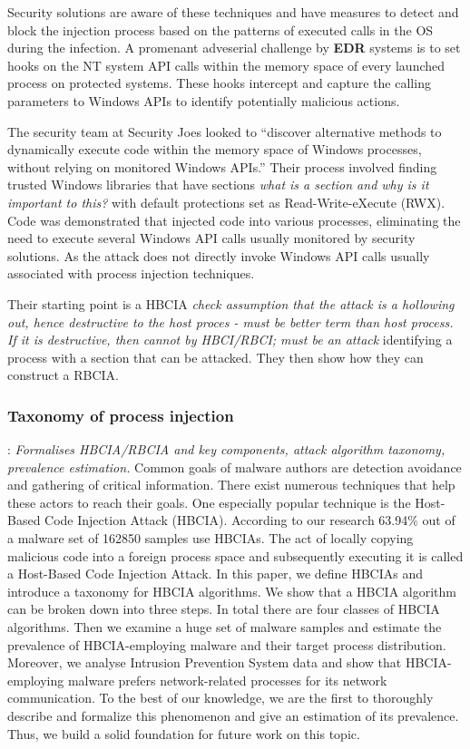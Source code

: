 \documentclass{article}
\begin{document}
Security solutions are aware of these techniques and have measures to detect and block the injection process based
on the patterns of executed calls in the OS during the infection.  A promenant adveserial challenge by \textbf{EDR}
systems is to set hooks on the NT system API calls within the memory space of every launched process on protected
systems.  These hooks intercept and capture the calling parameters to Windows APIs to identify potentially malicious actions.

The security team at Security Joes looked to ``discover alternative methods to dynamically execute code within
the memory space of Windows processes, without relying on monitored Windows APIs.''  Their process involved
finding trusted Windows libraries that have sections \textit{what is a section and why is it important to this?}
with default protections set as Read-Write-eXecute (RWX).  Code was demonstrated that injected code into various
processes, eliminating the need to execute several Windows API calls usually monitored by security solutions.
As the attack does not directly invoke Windows API calls usually associated with process injection techniques.

Their starting point is a HBCIA \textit{check assumption that the attack is a hollowing out, hence destructive to the host proces - must be better term than host process. If it is destructive, then cannot by HBCI/RBCI; must be an attack} identifying a process with a section that can be attacked.  They then show how they can construct a RBCIA.

\subsubsection{\textcite{Barabosch:2014} Taxonomy of process injection}
\textbf{}: \textit{Formalises HBCIA/RBCIA and key components, attack algorithm taxonomy, prevalence estimation.}  Common goals of malware authors are detection avoidance and gathering of critical information. There exist numerous techniques that help these actors to reach their goals. One especially popular technique is the Host-Based Code Injection Attack (HBCIA). According to our research 63.94\% out of a malware set of 162850 samples use HBCIAs. The act of locally copying malicious code into a foreign process space and subsequently executing it is called a Host-Based Code Injection Attack. In this paper, we define HBCIAs and introduce a taxonomy for HBCIA algorithms. We show that a HBCIA algorithm can be broken down into three steps. In total there are four classes of HBCIA algorithms. Then we examine a huge set of malware samples and estimate the prevalence of HBCIA-employing malware and their target process distribution. Moreover, we analyse Intrusion Prevention System data and show that HBCIA-employing malware prefers network-related processes for its network communication. To the best of our knowledge, we are the first to thoroughly describe and formalize this phenomenon and give an estimation of its prevalence. Thus, we build a solid foundation for future work on this topic.
\end{document}
